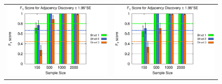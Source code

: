 \documentclass{edm_template}
\begin{document}
	\begin{figure}[ht]
		\begin{center}
			\begin{tabular}{>{\centering}m{1.5in} >{\centering\arraybackslash}m{1.5in}}
				\includegraphics[width=1.1\linewidth]{figures/F1A_single.eps} &\includegraphics[width=1.1\linewidth]{figures/F1A_multi.eps}\\

\end{tabular}
\end{center}
\end{figure}
\end{document}
